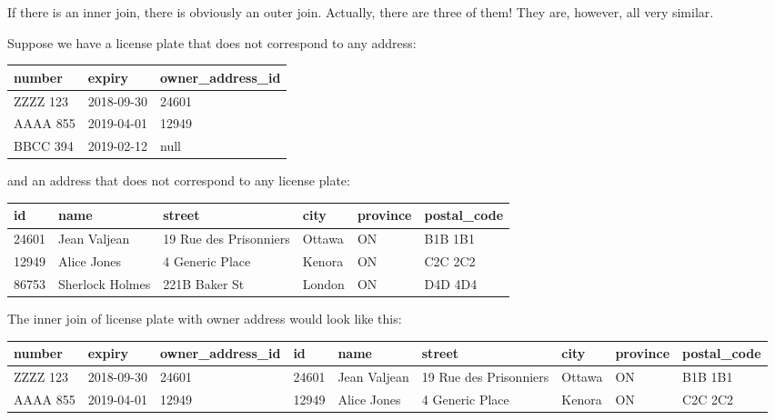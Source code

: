 \documentclass[a4paper]{report}
\begin{document}
If there is an inner join, there is obviously an outer join. Actually, there are three of them! They are, however, all very similar.  

Suppose we have a license plate that does not correspond to any address: 

\begin{center}
\begin{tabular}{|l|l|l|}\hline
	\textbf{number} & \textbf{expiry} & \textbf{owner\_address\_id} \\ \hline
	ZZZZ 123 & 2018-09-30 & 24601 \\ \hline
	AAAA 855 & 2019-04-01 & 12949 \\ \hline
	BBCC 394 & 2019-02-12 & null \\ \hline
\end{tabular}
\end{center}

and an address that does not correspond to any license plate:

\begin{center}
	\begin{tabular}{|l|l|l|l|l|l|}\hline
		\textbf{id} & \textbf{name} &\textbf{street} & \textbf{city} & \textbf{province} & \textbf{postal\_code} \\ \hline
		24601 & Jean Valjean & 19 Rue des Prisonniers & Ottawa & ON & B1B 1B1\\ \hline
		12949 & Alice Jones & 4 Generic Place & Kenora & ON & C2C 2C2\\ \hline
		86753 & Sherlock Holmes & 221B Baker St & London & ON & D4D 4D4\\ \hline
	\end{tabular}
\end{center}

The inner join of license plate with owner address would look like this: 

{\scriptsize
\begin{center}
	\begin{tabular}{|l|l|l|l|l|l|l|l|l|}\hline
		\textbf{number} & \textbf{expiry} & \textbf{owner\_address\_id} & \textbf{id} & \textbf{name} &\textbf{street} & \textbf{city} & \textbf{province} & \textbf{postal\_code} \\ \hline
		ZZZZ 123 & 2018-09-30 & 24601 & 24601 & Jean Valjean & 19 Rue des Prisonniers & Ottawa & ON & B1B 1B1\\ \hline
		AAAA 855 & 2019-04-01 & 12949 & 12949 & Alice Jones & 4 Generic Place & Kenora & ON & C2C 2C2\\ \hline
	\end{tabular}
\end{center}
}
\end{document}
